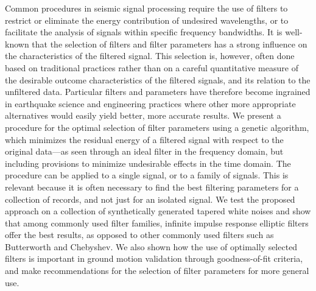 % 
Common procedures in seismic signal processing require the use of filters to restrict or eliminate the energy contribution of undesired wavelengths, or to facilitate the analysis of signals within specific frequency bandwidths. It is well-known that the selection of filters and filter parameters has a strong influence on the characteristics of the filtered signal. This selection is, however, often done based on traditional practices rather than on a careful quantitative measure of the desirable outcome characteristics of the filtered signals, and its relation to the unfiltered data. Particular filters and parameters have therefore become ingrained in earthquake science and engineering practices where other more appropriate alternatives would easily yield better, more accurate results. We present a procedure for the optimal selection of filter parameters using a genetic algorithm, which minimizes the residual energy of a filtered signal with respect to the original data---as seen through an ideal filter in the frequency domain, but including provisions to minimize undesirable effects in the time domain. The procedure can be applied to a single signal, or to a family of signals. This is relevant because it is often necessary to find the best filtering parameters for a collection of records, and not just for an isolated signal. We test the proposed approach on a collection of synthetically generated tapered white noises and show that among commonly used filter families, infinite impulse response elliptic filters offer the best results, as opposed to other commonly used filters such as Butterworth and Chebyshev. We also shown how the use of optimally selected filters is important in ground motion validation through goodness-of-fit criteria, and make recommendations for the selection of filter parameters for more general use.





